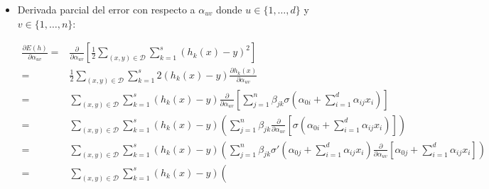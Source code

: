 \begin{itemize}
    \item Derivada parcial del error con respecto a $\alpha_{u v}$ donde $u \in \{1, \ldots, d\}$ y $v \in \{1, \ldots, n\}$:
    
    \begin{align} \label{eq:parcial_alpha_i}
        \frac{\partial E(h)}{\partial \alpha_{u v}} 
        =&
        \frac{\partial}{\partial \alpha_{u v}}
        \left[
            \frac{1}{2}
            \sum_{(x,y) \in \mathcal{D}}
            \sum_{k = 1}^s 
            \left(h_k(x) - y\right)^2
        \right]
        \\ %
        = &
        \frac{1}{2}
        \sum_{(x,y) \in \mathcal{D}}
        \sum_{k = 1}^s 
        2 \left(h_k(x) - y\right)
        \frac{\partial h_k(x)}{\partial \alpha_{u v}} 
        \\ 
        = & %
        \sum_{(x,y) \in \mathcal{D}}
        \sum_{k = 1}^s 
        \left(h_k(x) - y\right)
        \frac{\partial}{\partial \alpha_{u v}} 
        \left[
            \sum_{j = 1}^n 
                \beta_{j k}
                \sigma
                \left(  
                    \alpha_{0 i} +
                    \sum_{i=1}^d \alpha_{i j}x_i
                \right)
        \right] 
        \\ 
        = & %
        \sum_{(x,y) \in \mathcal{D}}
        \sum_{k = 1}^s 
        \left(h_k(x) - y\right)
        \left(
            \sum_{j = 1}^n 
            \beta_{j k}
            \frac{\partial}{\partial \alpha_{u v}} 
            \left[
                \sigma
                \left(  
                    \alpha_{0 i} +
                    \sum_{i=1}^d \alpha_{i j}x_i
                \right)
            \right]
        \right) 
        \\ 
        = & %
        \sum_{(x,y) \in \mathcal{D}}
        \sum_{k = 1}^s 
        \left(h_k(x) - y\right)
        \left(
            \sum_{j = 1}^n 
            \beta_{j k}
            \sigma '
            \left(  
                \alpha_{0 j} +
                \sum_{i=1}^d \alpha_{i j}x_i
            \right)
            \frac{\partial}{\partial \alpha_{u v}}    
            \left[
                \alpha_{0 j} +
                \sum_{i=1}^d \alpha_{i j}x_i
            \right]
        \right) 
        \\ 
        = & %
        \sum_{(x,y) \in \mathcal{D}}
        \sum_{k = 1}^s 
        \left(h_k(x) - y\right)
        \left(

\end{align}
\end{itemize}

